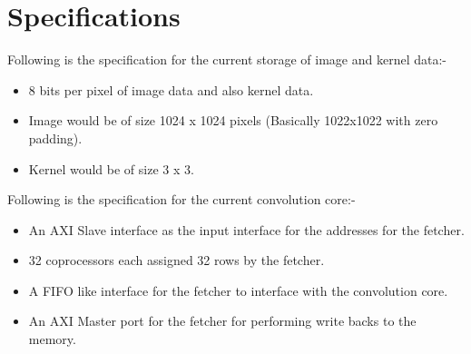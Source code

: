 \chapter{Specifications}

Following is the specification for the current storage of image and kernel data:-

\begin{itemize}

\item 8 bits per pixel of image data and also kernel data.
\item Image would be of size 1024 x 1024 pixels (Basically 1022x1022 with zero padding).
\item Kernel would be of size 3 x 3.

\end{itemize}

Following is the specification for the current convolution core:- 

\begin{itemize}

\item An AXI Slave interface as the input interface for the addresses for the fetcher.
\item 32 coprocessors each assigned 32 rows by the fetcher.
\item A FIFO like interface for the fetcher to interface with the convolution core.
\item An AXI Master port for the fetcher for performing write backs to the memory.

\end{itemize}
